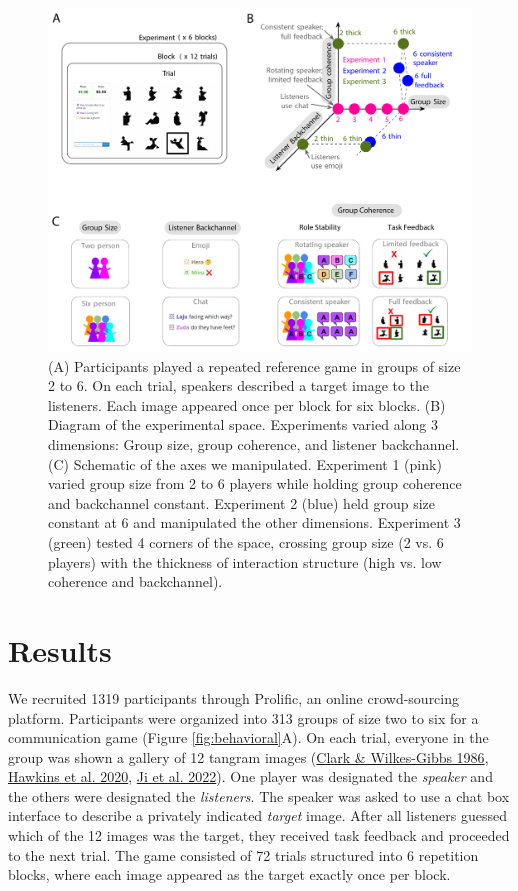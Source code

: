 \documentclass[
  english,
]{article}
\begin{document}
\begin{figure}[t!]

{\centering \includegraphics[width=1\linewidth]{fig1} 

}

\caption{(A) Participants played a repeated reference game in groups of size 2 to 6. On each trial, speakers described a target image to the listeners. Each image appeared once per block for six blocks. (B) Diagram of the experimental space. Experiments varied along 3 dimensions: Group size, group coherence, and listener backchannel. (C) Schematic of the axes we manipulated. Experiment 1 (pink) varied group size from 2 to 6 players while holding group coherence and backchannel constant. Experiment 2 (blue) held group size constant at 6 and manipulated the other dimensions. Experiment 3 (green) tested 4 corners of the space, crossing group size (2 vs. 6 players) with the thickness of interaction structure (high vs. low coherence and backchannel).}\label{fig:diagram}
\end{figure}

\hypertarget{results}{%
\section{Results}\label{results}}

We recruited 1319 participants through Prolific, an online crowd-sourcing platform.
Participants were organized into 313 groups of size two to six for a communication game (Figure \ref{fig:behavioral}A).
On each trial, everyone in the group was shown a gallery of 12 tangram images (\protect\hyperlink{ref-clark1986}{Clark \& Wilkes-Gibbs 1986}, \protect\hyperlink{ref-hawkins2020}{Hawkins et al. 2020}, \protect\hyperlink{ref-ji2022abstract}{Ji et al. 2022}).
One player was designated the \emph{speaker} and the others were designated the \emph{listeners}.
The speaker was asked to use a chat box interface to describe a privately indicated \emph{target} image.
After all listeners guessed which of the 12 images was the target, they received task feedback and proceeded to the next trial.
The game consisted of 72 trials structured into 6 repetition blocks, where each image appeared as the target exactly once per block.
\end{document}
